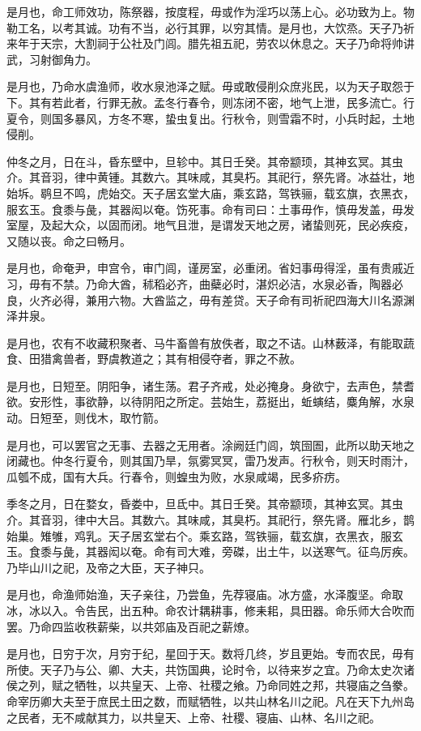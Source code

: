 \documentclass[]{article}
\begin{document}
是月也，命工师效功，陈祭器，按度程，毋或作为淫巧以荡上心。必功致为上。物勒工名，以考其诚。功有不当，必行其罪，以穷其情。是月也，大饮烝。天子乃祈来年于天宗，大割祠于公社及门闾。腊先祖五祀，劳农以休息之。天子乃命将帅讲武，习射御角力。

是月也，乃命水虞渔师，收水泉池泽之赋。毋或敢侵削众庶兆民，以为天子取怨于下。其有若此者，行罪无赦。孟冬行春令，则冻闭不密，地气上泄，民多流亡。行夏令，则国多暴风，方冬不寒，蛰虫复出。行秋令，则雪霜不时，小兵时起，土地侵削。

仲冬之月，日在斗，昏东壁中，旦轸中。其日壬癸。其帝颛顼，其神玄冥。其虫介。其音羽，律中黄锺。其数六。其味咸，其臭朽。其祀行，祭先肾。冰益壮，地始坼。鹖旦不鸣，虎始交。天子居玄堂大庙，乘玄路，驾铁骊，载玄旗，衣黑衣，服玄玉。食黍与彘，其器闳以奄。饬死事。命有司曰：土事毋作，慎毋发盖，毋发室屋，及起大众，以固而闭。地气且泄，是谓发天地之房，诸蛰则死，民必疾疫，又随以丧。命之曰畅月。

是月也，命奄尹，申宫令，审门闾，谨房室，必重闭。省妇事毋得淫，虽有贵戚近习，毋有不禁。乃命大酋，秫稻必齐，曲蘗必时，湛炽必洁，水泉必香，陶器必良，火齐必得，兼用六物。大酋监之，毋有差贷。天子命有司祈祀四海大川名源渊泽井泉。

是月也，农有不收藏积聚者、马牛畜兽有放佚者，取之不诘。山林薮泽，有能取蔬食、田猎禽兽者，野虞教道之；其有相侵夺者，罪之不赦。

是月也，日短至。阴阳争，诸生荡。君子齐戒，处必掩身。身欲宁，去声色，禁耆欲。安形性，事欲静，以待阴阳之所定。芸始生，荔挺出，蚯螾结，麋角解，水泉动。日短至，则伐木，取竹箭。

是月也，可以罢官之无事、去器之无用者。涂阙廷门闾，筑囹圄，此所以助天地之闭藏也。仲冬行夏令，则其国乃旱，氛雾冥冥，雷乃发声。行秋令，则天时雨汁，瓜瓠不成，国有大兵。行春令，则蝗虫为败，水泉咸竭，民多疥疠。

季冬之月，日在婺女，昏娄中，旦氐中。其日壬癸。其帝颛顼，其神玄冥。其虫介。其音羽，律中大吕。其数六。其味咸，其臭朽。其祀行，祭先肾。雁北乡，鹊始巢。雉雊，鸡乳。天子居玄堂右个。乘玄路，驾铁骊，载玄旗，衣黑衣，服玄玉。食黍与彘，其器闳以奄。命有司大难，旁磔，出土牛，以送寒气。征鸟厉疾。乃毕山川之祀，及帝之大臣，天子神只。

是月也，命渔师始渔，天子亲往，乃尝鱼，先荐寝庙。冰方盛，水泽腹坚。命取冰，冰以入。令告民，出五种。命农计耦耕事，修耒耜，具田器。命乐师大合吹而罢。乃命四监收秩薪柴，以共郊庙及百祀之薪燎。

是月也，日穷于次，月穷于纪，星回于天。数将几终，岁且更始。专而农民，毋有所使。天子乃与公、卿、大夫，共饬国典，论时令，以待来岁之宜。乃命太史次诸侯之列，赋之牺牲，以共皇天、上帝、社稷之飨。乃命同姓之邦，共寝庙之刍豢。命宰历卿大夫至于庶民土田之数，而赋牺牲，以共山林名川之祀。凡在天下九州岛之民者，无不咸献其力，以共皇天、上帝、社稷、寝庙、山林、名川之祀。
\end{document}
